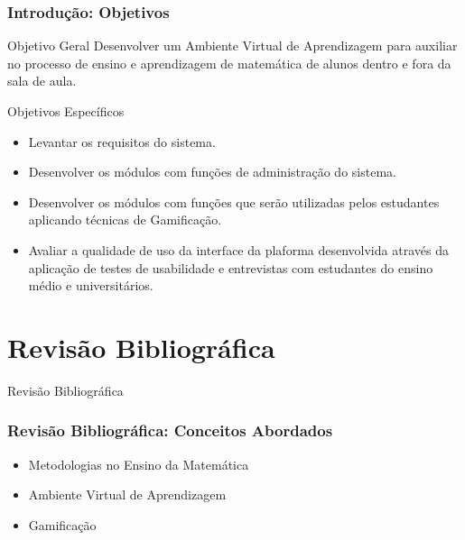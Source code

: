 \documentclass[aspectratio=169]{beamer}
\begin{document}
\begin{frame}
\frametitle{Introdução: Objetivos}

\begin{block}{Objetivo Geral}
	Desenvolver um Ambiente Virtual de Aprendizagem para auxiliar no processo de ensino e aprendizagem de matemática de alunos dentro e fora da sala de aula.
	\pause
\end{block}

\begin{block}{Objetivos Específicos}

\begin{itemize}
  \item Levantar os requisitos do sistema.
  \pause
  \item Desenvolver os módulos com funções de administração do sistema.
  \pause
  \item Desenvolver os módulos com funções que serão utilizadas pelos estudantes aplicando técnicas de Gamificação.
  \pause
  \item Avaliar a qualidade de uso da interface da plaforma desenvolvida através da aplicação de testes de usabilidade e entrevistas com estudantes do ensino médio e universitários.
\end{itemize}

\end{block}

\end{frame}

\section{Revisão Bibliográfica}

\begin{frame}{Revisão Bibliográfica}
\frametitle{Revisão Bibliográfica: Conceitos Abordados}

\begin{itemize}
	\item Metodologias no Ensino da Matemática
	\item Ambiente Virtual de Aprendizagem
	\item Gamifica\c{c}\~ao
\end{itemize}

\end{frame}
\end{document}
